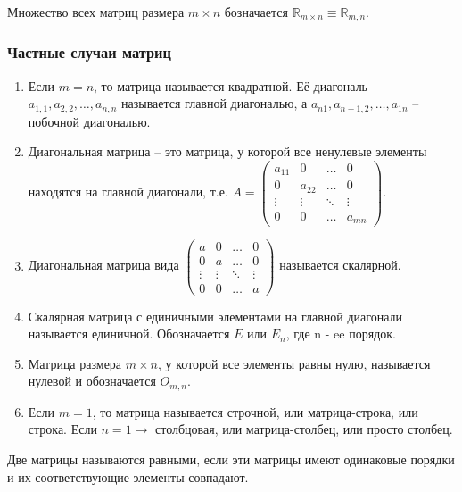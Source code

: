 Множество всех матриц размера $m \times n$ бозначается $\mathds{R}_{m \times n} \equiv \mathds{R}_{m,n}$.

\subsubsection{Частные случаи матриц}
\begin{enumerate}
  \item Если $m = n$, то матрица называется квадратной.
    Её диагональ $a_{1,1}, a_{2,2}, \dots, a_{n,n}$ называется главной диагональю, а $a_{n1}, a_{n-1,2}, \dots, a_{1n}$ – побочной диагональю.

  \item Диагональная матрица – это матрица, у которой все ненулевые элементы находятся на главной диагонали, т.е.
    $A = \left( \begin{array}{cccc}
      a_{11}& 0 &\ldots & 0\\
      0& a_{22} &\ldots & 0\\
      \vdots& \vdots &\ddots & \vdots\\
      0& 0 &\ldots & a_{mn}
    \end{array} \right)$.

  \item Диагональная матрица вида
    $\left( \begin{array}{cccc}
      a& 0 &\ldots & 0\\
      0& a &\ldots & 0\\
      \vdots& \vdots &\ddots & \vdots\\
      0& 0 &\ldots & a
    \end{array} \right)$ называется скалярной.

  \item Скалярная матрица с единичными элементами на главной диагонали называется единичной.
    Обозначается $E$ или $E_{n}$, где n - ee порядок.

  \item Матрица размера $m \times n$, у которой все элементы равны нулю, называется нулевой и обозначается $O_{m,n}$.

  \item Если $m = 1$, то матрица называется строчной, или матрица-строка, или строка.
    Если $n = 1 \rightarrow$ столбцовая, или матрица-столбец, или просто столбец.
\end{enumerate}

\begin{definition}
  Две матрицы называются равными, если эти матрицы имеют одинаковые порядки и их соответствующие элементы совпадают.
\end{definition}

